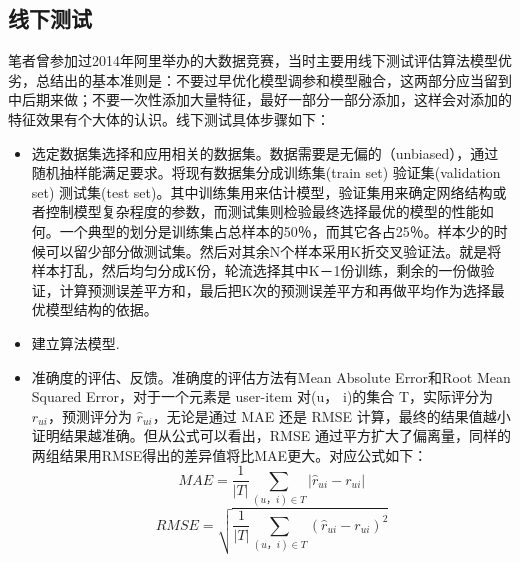       \subsection{线下测试}
      笔者曾参加过2014年阿里举办的大数据竞赛，当时主要用线下测试评估算法模型优劣，总结出的基本准则是：不要过早优化模型调参和模型融合，这两部分应当留到中后期来做；不要一次性添加大量特征，最好一部分一部分添加，这样会对添加的特征效果有个大体的认识。线下测试具体步骤如下：
      \begin{itemize}
      \item 选定数据集选择和应用相关的数据集。数据需要是无偏的（unbiased），通过随机抽样能满足要求。将现有数据集分成训练集(train set) 验证集(validation set) 测试集(test set)。其中训练集用来估计模型，验证集用来确定网络结构或者控制模型复杂程度的参数，而测试集则检验最终选择最优的模型的性能如何。一个典型的划分是训练集占总样本的50％，而其它各占25％。样本少的时候可以留少部分做测试集。然后对其余N个样本采用K折交叉验证法。就是将样本打乱，然后均匀分成K份，轮流选择其中K－1份训练，剩余的一份做验证，计算预测误差平方和，最后把K次的预测误差平方和再做平均作为选择最优模型结构的依据。
      \item 建立算法模型.
      \item 准确度的评估、反馈。准确度的评估方法有Mean Absolute Error和Root Mean Squared Error，对于一个元素是 user-item 对(u， i)的集合 T，实际评分为 $r_{ui}$，预测评分为 $\hat{r}_{ui}$，无论是通过 MAE 还是 RMSE 计算，最终的结果值越小证明结果越准确。但从公式可以看出，RMSE 通过平方扩大了偏离量，同样的两组结果用RMSE得出的差异值将比MAE更大。对应公式如下：
      \begin{equation}
        MAE = \frac{1}{|T |} \sum_{(u，i)\in T}|\hat{r}_{ui}-r_{ui}|
        \label{cosine-similiarity}
      \end{equation}
      \begin{equation}
        RMSE = \sqrt{\frac{1}{|T |} \sum_{(u，i)\in T}(\hat{r}_{ui}-r_{ui})^2}
        \label{cosine-similiarity}
      \end{equation}
      \end{itemize}
      


